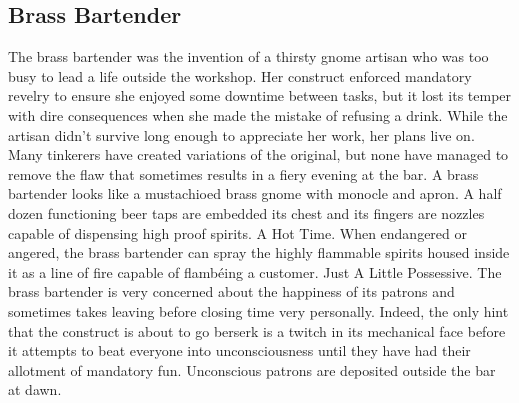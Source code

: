 \documentclass[10pt,a4paper,twoside,twocolumn,openany,bg=print,nodeprecatedcode]{dndbook}
\begin{document}
\subsection{Brass Bartender}
The brass bartender was the invention of a thirsty gnome artisan who was too busy to lead a life outside the workshop. Her construct enforced mandatory revelry to ensure she enjoyed some downtime between tasks, but it lost its temper with dire consequences when she made the mistake of refusing a drink. While the artisan didn't survive long enough to appreciate her work, her plans live on. Many tinkerers have created variations of the original, but none have managed to remove the flaw that sometimes results in a fiery evening at the bar.
A brass bartender looks like a mustachioed brass gnome with monocle and apron. A half dozen functioning beer taps are embedded its chest and its fingers are nozzles capable of dispensing high proof spirits.
A Hot Time. When endangered or angered, the brass bartender can spray the highly flammable spirits housed inside it as a line of fire capable of flambéing a customer.
Just A Little Possessive. The brass bartender is very concerned about the happiness of its patrons and sometimes takes leaving before closing time very personally. Indeed, the only hint that the construct is about to go berserk is a twitch in its mechanical face before it attempts to beat everyone into unconsciousness until they have had their allotment of mandatory fun. Unconscious patrons are deposited outside the bar at dawn.
\end{document}
